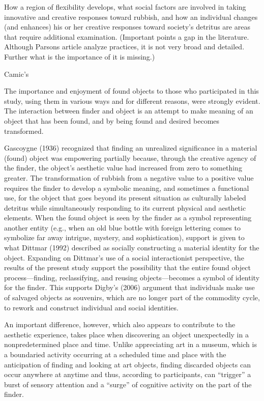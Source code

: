 How a region of flexibility develops, what social factors are involved in taking innovative and creative responses toward rubbish, and how an individual changes (and enhances) his or her creative responses toward society’s detritus are areas that require additional examination. (Important points a gap in the literature. Although Parsons article analyze practices, it is not very broad and detailed. Further what is the importance of it is missing.)

Camic's  


The importance and enjoyment of found objects to those who participated in this study, using them in various ways and for different reasons, were strongly evident. The interaction between finder and object is an attempt to make meaning of an object that has been found, and by being found and desired becomes transformed.

Gascoygne (1936) recognized that finding an unrealized significance in a material (found) object was empowering partially because, through the creative agency of the finder, the object’s aesthetic value had increased from zero to something greater. The transformation of rubbish from a negative value to a positive value requires the finder to develop a symbolic meaning, and sometimes a functional use, for the object that goes beyond its present situation as culturally labeled detritus while simultaneously responding to its current physical and aesthetic elements. When the found object is seen by the finder as a symbol representing another entity (e.g., when an old blue bottle with foreign lettering comes to symbolize far away intrigue, mystery, and sophistication), support is given to what Dittmar (1992) described as socially constructing a material identity for the object. Expanding on Dittmar’s use of a social interactionist perspective, the results of the present study support the possibility that the entire found object process---finding, reclassifying, and reusing objects---becomes a symbol of identity for the finder. This supports Digby’s (2006) argument that individuals make use of salvaged objects as souvenirs, which are no longer part of the commodity cycle, to rework and construct individual and social identities.

An important difference, however, which also appears to contribute to the aesthetic experience, takes place when discovering an object unexpectedly in a nonpredetermined place and time. Unlike appreciating art in a museum, which is a boundaried activity occurring at a scheduled time and place with the anticipation of finding and looking at art objects, finding discarded objects can occur anywhere at anytime and thus, according to participants, can “trigger” a burst of sensory attention and a “surge” of cognitive activity on the part of the finder. 

